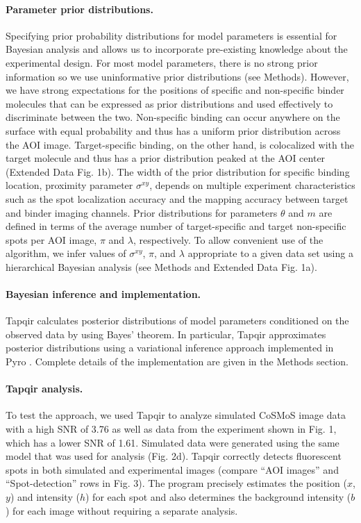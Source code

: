 \paragraph{Parameter prior distributions.}
Specifying prior probability distributions for model parameters is essential for Bayesian analysis and allows us to incorporate pre-existing knowledge about the experimental design. For most model parameters, there is no strong prior information so we use uninformative prior distributions (see Methods). However, we have strong expectations for the positions of specific and non-specific binder molecules that can be expressed as prior distributions and used effectively to discriminate between the two. Non-specific binding can occur anywhere on the surface with equal probability and thus has a uniform prior distribution across the AOI image. Target-specific binding, on the other hand, is colocalized with the target molecule and thus has a prior distribution peaked at the AOI center (Extended Data Fig. 1b). The width of the prior distribution for specific binding location, proximity parameter $\sigma^{xy}$, depends on multiple experiment characteristics such as the spot localization accuracy and the mapping accuracy between target and binder imaging channels. Prior distributions for parameters $\theta$ and $m$ are defined in terms of the average number of target-specific and target non-specific spots per AOI image, $\pi$ and $\lambda$, respectively. To allow convenient use of the algorithm, we infer values of $\sigma^{xy}$, $\pi$, and $\lambda$ appropriate to a given data set using a hierarchical Bayesian analysis (see Methods and Extended Data Fig. 1a).

\paragraph{Bayesian inference and implementation.}
Tapqir calculates posterior distributions of model parameters conditioned on the observed data by using Bayes' theorem. In particular, Tapqir approximates posterior distributions using a variational inference approach implemented in Pyro \cite{Bingham2019-qy}.  Complete details of the implementation are given in the Methods section.

\paragraph{Tapqir analysis.} %
To test the approach, we used Tapqir to analyze simulated CoSMoS image data with a high SNR of 3.76 as well as data from the experiment shown in Fig. 1, which has a lower SNR of 1.61. Simulated data were generated using the same model that was used for analysis (Fig. 2d). Tapqir correctly detects fluorescent spots in both simulated and experimental images (compare ``AOI images'' and ``Spot-detection'' rows in Fig. 3). The program precisely estimates the position ($x$,$y$) and intensity ($h$) for each spot and also determines the background intensity ($b$) for each image without requiring a separate analysis. 

